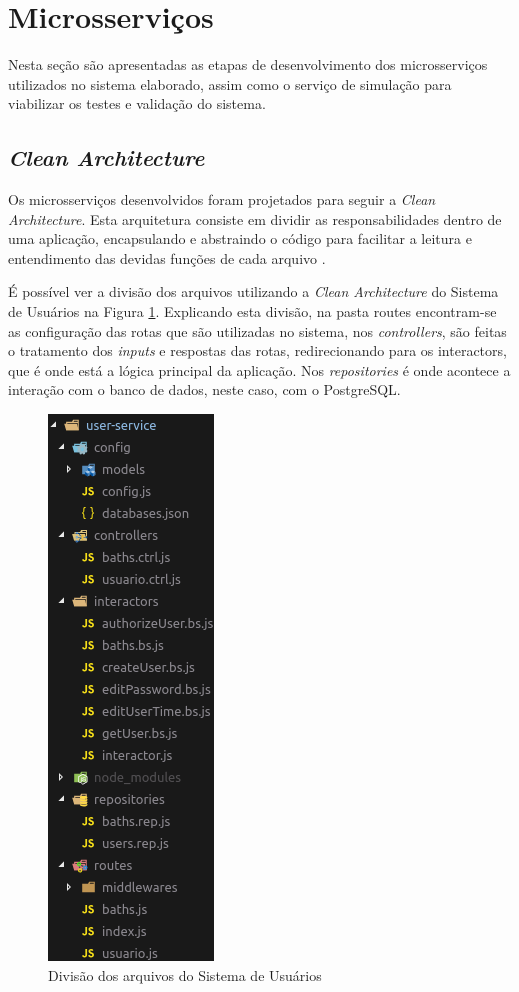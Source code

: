 \section{Microsserviços}

Nesta seção são apresentadas as etapas de desenvolvimento dos microsserviços utilizados no sistema elaborado, assim como o serviço de simulação para viabilizar os testes e validação do sistema.

\subsection{\textit{Clean Architecture}}

Os microsserviços desenvolvidos foram projetados para seguir a \textit{Clean Architecture}. Esta arquitetura consiste em dividir as responsabilidades dentro de uma aplicação, encapsulando e abstraindo o código para facilitar a leitura e entendimento das devidas funções de cada arquivo \cite{martin2000clean}.

É possível ver a divisão dos arquivos utilizando a \textit{Clean Architecture} do Sistema de Usuários na Figura \ref{fig:clean}. Explicando esta divisão, na pasta routes encontram-se as configuração das rotas que são utilizadas no sistema, nos \textit{controllers}, são feitas o tratamento dos \textit{inputs} e respostas das rotas, redirecionando para os interactors, que é onde está a lógica principal da aplicação. Nos \textit{repositories} é onde acontece a interação com o banco de dados, neste caso, com o PostgreSQL.

\begin{figure}[htbp]
	\centering
	\includegraphics[width=0.22\linewidth]{figuras/cleanarch.png}
	\caption{Divisão dos arquivos do Sistema de Usuários}
	\label{fig:clean}
\end{figure}



